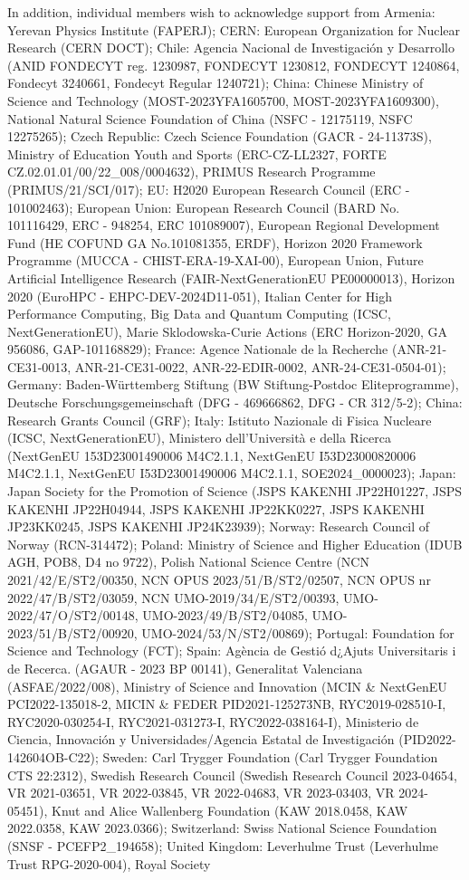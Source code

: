 \documentclass[PAPER, atlasdraft=false, USenglish, cernpreprint]{atlasdoc}
\begin{document}
In addition, individual members wish to acknowledge support from Armenia: Yerevan Physics Institute (FAPERJ); CERN: European Organization for Nuclear Research (CERN DOCT); Chile: Agencia Nacional de Investigaci\'on y Desarrollo (ANID FONDECYT reg. 1230987, FONDECYT 1230812, FONDECYT 1240864, Fondecyt 3240661, Fondecyt Regular 1240721); China: Chinese Ministry of Science and Technology (MOST-2023YFA1605700, MOST-2023YFA1609300), National Natural Science Foundation of China (NSFC - 12175119, NSFC 12275265); Czech Republic: Czech Science Foundation (GACR - 24-11373S), Ministry of Education Youth and Sports (ERC-CZ-LL2327, FORTE CZ.02.01.01/00/22\_008/0004632), PRIMUS Research Programme (PRIMUS/21/SCI/017); EU: H2020 European Research Council (ERC - 101002463); European Union: European Research Council (BARD No. 101116429, ERC - 948254, ERC 101089007), European Regional Development Fund (HE COFUND GA No.101081355, ERDF), Horizon 2020 Framework Programme (MUCCA - CHIST-ERA-19-XAI-00), European Union, Future Artificial Intelligence Research (FAIR-NextGenerationEU PE00000013), Horizon 2020 (EuroHPC - EHPC-DEV-2024D11-051), Italian Center for High Performance Computing, Big Data and Quantum Computing (ICSC, NextGenerationEU), Marie Sklodowska-Curie Actions (ERC Horizon-2020, GA 956086, GAP-101168829); France: Agence Nationale de la Recherche (ANR-21-CE31-0013, ANR-21-CE31-0022, ANR-22-EDIR-0002, ANR-24-CE31-0504-01); Germany: Baden-Württemberg Stiftung (BW Stiftung-Postdoc Eliteprogramme), Deutsche Forschungsgemeinschaft (DFG - 469666862, DFG - CR 312/5-2); China: Research Grants Council (GRF); Italy: Istituto Nazionale di Fisica Nucleare (ICSC, NextGenerationEU), Ministero dell'Università e della Ricerca (NextGenEU 153D23001490006 M4C2.1.1, NextGenEU I53D23000820006 M4C2.1.1, NextGenEU I53D23001490006 M4C2.1.1, SOE2024\_0000023); Japan: Japan Society for the Promotion of Science (JSPS KAKENHI JP22H01227, JSPS KAKENHI JP22H04944, JSPS KAKENHI JP22KK0227, JSPS KAKENHI JP23KK0245, JSPS KAKENHI JP24K23939); Norway: Research Council of Norway (RCN-314472); Poland: Ministry of Science and Higher Education (IDUB AGH, POB8, D4 no 9722), Polish National Science Centre (NCN 2021/42/E/ST2/00350, NCN OPUS 2023/51/B/ST2/02507, NCN OPUS nr 2022/47/B/ST2/03059, NCN UMO-2019/34/E/ST2/00393, UMO-2022/47/O/ST2/00148, UMO-2023/49/B/ST2/04085, UMO-2023/51/B/ST2/00920, UMO-2024/53/N/ST2/00869); Portugal: Foundation for Science and Technology (FCT); Spain: Agència de Gestió d¿Ajuts Universitaris i de Recerca. (AGAUR - 2023 BP 00141), Generalitat Valenciana (ASFAE/2022/008), Ministry of Science and Innovation (MCIN \& NextGenEU PCI2022-135018-2, MICIN \& FEDER PID2021-125273NB, RYC2019-028510-I, RYC2020-030254-I, RYC2021-031273-I, RYC2022-038164-I), Ministerio de Ciencia, Innovación y Universidades/Agencia Estatal de Investigaci\'on (PID2022-142604OB-C22); Sweden: Carl Trygger Foundation (Carl Trygger Foundation CTS 22:2312), Swedish Research Council (Swedish Research Council 2023-04654, VR 2021-03651, VR 2022-03845, VR 2022-04683, VR 2023-03403, VR 2024-05451), Knut and Alice Wallenberg Foundation (KAW 2018.0458, KAW 2022.0358, KAW 2023.0366); Switzerland: Swiss National Science Foundation (SNSF - PCEFP2\_194658); United Kingdom: Leverhulme Trust (Leverhulme Trust RPG-2020-004), Royal Society 
\end{document}
